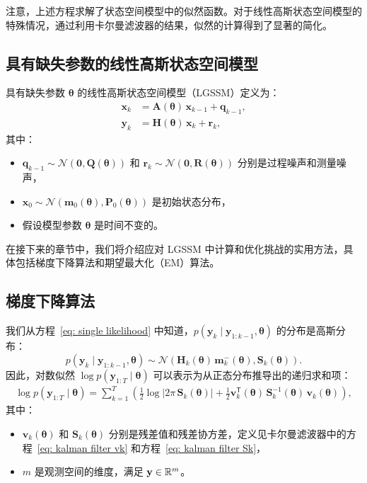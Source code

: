 注意，上述方程求解了状态空间模型中的似然函数。对于线性高斯状态空间模型的特殊情况，通过利用卡尔曼滤波器的结果，似然的计算得到了显著的简化。

\subsection{具有缺失参数的线性高斯状态空间模型}

具有缺失参数 \(\boldsymbol{\theta}\) 的线性高斯状态空间模型（LGSSM）定义为：
\begin{align*}
    \mathbf{x}_k &= \mathbf{A}(\boldsymbol{\theta}) \, \mathbf{x}_{k-1} + \mathbf{q}_{k-1}, \\
    \mathbf{y}_k &= \mathbf{H}(\boldsymbol{\theta}) \, \mathbf{x}_k + \mathbf{r}_k,
\end{align*}
其中：
\begin{itemize}
    \item \(\mathbf{q}_{k-1} \sim \mathcal{N}(\mathbf{0}, \mathbf{Q}(\boldsymbol{\theta}))\) 和 \(\mathbf{r}_{k} \sim \mathcal{N}(\mathbf{0}, \mathbf{R}(\boldsymbol{\theta}))\) 分别是过程噪声和测量噪声，
    \item \(\mathbf{x}_0 \sim \mathcal{N}(\mathbf{m}_0(\boldsymbol{\theta}), \mathbf{P}_0(\boldsymbol{\theta}))\) 是初始状态分布，
    \item 假设模型参数 \(\boldsymbol{\theta}\) 是时间不变的。
\end{itemize}

在接下来的章节中，我们将介绍应对 LGSSM 中计算和优化挑战的实用方法，具体包括梯度下降算法和期望最大化（EM）算法。

\subsection{梯度下降算法}

我们从方程~\eqref{eq: single likelihood} 中知道，\(p(\mathbf{y}_k \mid \mathbf{y}_{1:k-1}, \boldsymbol{\theta})\) 的分布是高斯分布：
\[
p(\mathbf{y}_k \mid \mathbf{y}_{1:k-1}, \boldsymbol{\theta}) \sim \mathcal{N}(\mathbf{H}_k(\boldsymbol{\theta}) \, \mathbf{m}_k^-(\boldsymbol{\theta}), \mathbf{S}_k(\boldsymbol{\theta})).
\]
因此，对数似然 \(\log p(\mathbf{y}_{1:T} \mid \boldsymbol{\theta})\) 可以表示为从正态分布推导出的递归求和项：
\begin{align*}
    \log p(\mathbf{y}_{1:T} \mid \boldsymbol{\theta}) = \sum^T_{k=1} \left( \frac{1}{2} \log | 2 \pi \, \mathbf{S}_k(\boldsymbol{\theta}) | + \frac{1}{2} \mathbf{v}_k^{\mathsf{T}}(\boldsymbol{\theta}) \, \mathbf{S}_k^{-1}(\boldsymbol{\theta}) \, \mathbf{v}_k (\boldsymbol{\theta}) \right),
\end{align*}
其中：
\begin{itemize}
    \item \(\mathbf{v}_k (\boldsymbol{\theta})\) 和 \(\mathbf{S}_k(\boldsymbol{\theta})\) 分别是残差值和残差协方差，定义见卡尔曼滤波器中的方程~\eqref{eq: kalman filter vk} 和方程~\eqref{eq: kalman filter Sk}，
    \item \(m\) 是观测空间的维度，满足 \(\mathbf{y} \in \mathbb{R}^m\)。
\end{itemize}

